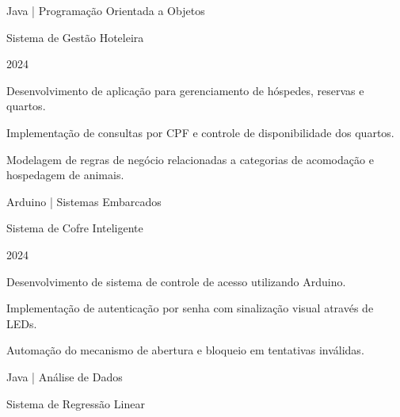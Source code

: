 
\begin{cventries}

\cventry

  {Java | Programação Orientada a Objetos}

  {Sistema de Gestão Hoteleira}

  {}

  {2024}

  {

    \begin{cvitems}

      \item {Desenvolvimento de aplicação para gerenciamento de hóspedes, reservas e quartos.}

      \item {Implementação de consultas por CPF e controle de disponibilidade dos quartos.}

      \item {Modelagem de regras de negócio relacionadas a categorias de acomodação e hospedagem de animais.}

    \end{cvitems}

  }

\cventry

  {Arduino | Sistemas Embarcados}

  {Sistema de Cofre Inteligente}

  {}

  {2024}

  {

    \begin{cvitems}

      \item {Desenvolvimento de sistema de controle de acesso utilizando Arduino.}

      \item {Implementação de autenticação por senha com sinalização visual através de LEDs.}

      \item {Automação do mecanismo de abertura e bloqueio em tentativas inválidas.}

    \end{cvitems}

  }

\cventry

  {Java | Análise de Dados}

  {Sistema de Regressão Linear}

  {}


\end{cventries}
